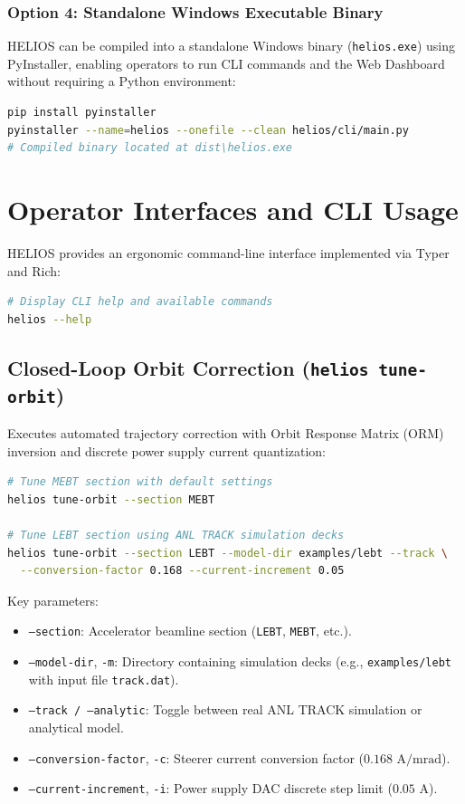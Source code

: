 \documentclass[11pt,a4paper]{report}
\begin{document}
\subsection{Option 4: Standalone Windows Executable Binary}
HELIOS can be compiled into a standalone Windows binary (\texttt{helios.exe}) using PyInstaller, enabling operators to run CLI commands and the Web Dashboard without requiring a Python environment:
\begin{lstlisting}[language=bash]
pip install pyinstaller
pyinstaller --name=helios --onefile --clean helios/cli/main.py
# Compiled binary located at dist\helios.exe
\end{lstlisting}

\chapter{Operator Interfaces and CLI Usage}

HELIOS provides an ergonomic command-line interface implemented via Typer and Rich:
\begin{lstlisting}[language=bash]
# Display CLI help and available commands
helios --help
\end{lstlisting}

\section{Closed-Loop Orbit Correction (\texttt{helios tune-orbit})}
Executes automated trajectory correction with Orbit Response Matrix (ORM) inversion and discrete power supply current quantization:
\begin{lstlisting}[language=bash]
# Tune MEBT section with default settings
helios tune-orbit --section MEBT

# Tune LEBT section using ANL TRACK simulation decks
helios tune-orbit --section LEBT --model-dir examples/lebt --track \
  --conversion-factor 0.168 --current-increment 0.05
\end{lstlisting}
Key parameters:
\begin{itemize}
    \item \texttt{--section}: Accelerator beamline section (\texttt{LEBT}, \texttt{MEBT}, etc.).
    \item \texttt{--model-dir}, \texttt{-m}: Directory containing simulation decks (e.g., \texttt{examples/lebt} with input file \texttt{track.dat}).
    \item \texttt{--track / --analytic}: Toggle between real ANL TRACK simulation or analytical model.
    \item \texttt{--conversion-factor}, \texttt{-c}: Steerer current conversion factor ($0.168\text{ A/mrad}$).
    \item \texttt{--current-increment}, \texttt{-i}: Power supply DAC discrete step limit ($0.05\text{ A}$).
\end{itemize}
\end{document}
